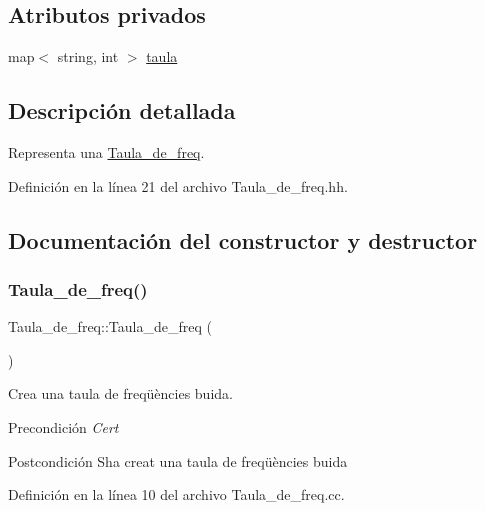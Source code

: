 \subsection*{Atributos privados}
\begin{DoxyCompactItemize}
\item 
map$<$ string, int $>$ \hyperlink{class_taula__de__freq_a2c7db75db1ccbbe347de775844f3bbd7}{taula}
\end{DoxyCompactItemize}


\subsection{Descripción detallada}
Representa una \hyperlink{class_taula__de__freq}{Taula\+\_\+de\+\_\+freq}. 

Definición en la línea 21 del archivo Taula\+\_\+de\+\_\+freq.\+hh.



\subsection{Documentación del constructor y destructor}
\mbox{\label{class_taula__de__freq_a57b8d780af285f09746da0a96dfd9d61}} 
\subsubsection{\texorpdfstring{Taula\+\_\+de\+\_\+freq()}{Taula\_de\_freq()}}
{\footnotesize\ttfamily Taula\+\_\+de\+\_\+freq\+::\+Taula\+\_\+de\+\_\+freq (\begin{DoxyParamCaption}{ }\end{DoxyParamCaption})}



Crea una taula de freqüències buida. 

\begin{DoxyPrecond}{Precondición}
{\itshape Cert} 
\end{DoxyPrecond}
\begin{DoxyPostcond}{Postcondición}
S\textquotesingle{}ha creat una taula de freqüències buida 
\end{DoxyPostcond}


Definición en la línea 10 del archivo Taula\+\_\+de\+\_\+freq.\+cc.


